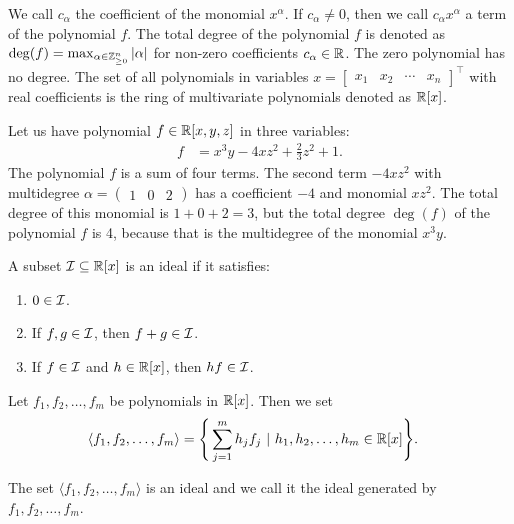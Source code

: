 We call $c_\alpha$ the coefficient of the monomial $x^\alpha$.
If $c_\alpha \neq 0$, then we call $c_\alpha x^\alpha$ a term of the polynomial $f$.
The total degree of the polynomial $f$ is denoted as $\deg(f) = \max_{\alpha\in\mathbb{Z}_{\geq0}^n} |\alpha|$ for non-zero coefficients $c_\alpha\in\mathbb{R}$.
The zero polynomial has no degree.
The set of all polynomials in variables $x = \begin{bmatrix}x_1 & x_2 & \cdots & x_n\end{bmatrix}^\top$ with real coefficients is the ring of multivariate polynomials denoted as $\mathbb{R}[x]$.

\begin{example}
  Let us have polynomial $f \in\mathbb{R}[x, y, z]$ in three variables:
  \begin{align}
    f &= x^3y - 4xz^2 + \frac{2}{3}z^2 + 1.
  \end{align}
  The polynomial $f$ is a sum of four terms.
  The second term $-4xz^2$ with multidegree $\alpha = \begin{pmatrix}1 & 0 & 2\end{pmatrix}$ has a coefficient $-4$ and monomial $xz^2$.
  The total degree of this monomial is $1 + 0 + 2 = 3$, but the total degree $\deg(f)$ of the polynomial $f$ is 4, because that is the multidegree of the monomial $x^3y$.
\end{example}

\begin{definition}
  A subset $\mathcal{I} \subseteq \mathbb{R}[x]$ is an ideal if it satisfies:
  \begin{enumerate}
    \item $0 \in \mathcal{I}$.
    \item If $f, g \in \mathcal{I}$, then $f + g \in \mathcal{I}$.
    \item If $f \in \mathcal{I}$ and $h \in \mathbb{R}[x]$, then $hf \in \mathcal{I}$.
  \end{enumerate}
\end{definition}

\begin{definition}
  Let $f_1, f_2, \ldots, f_m$ be polynomials in $\mathbb{R}[x]$.
  Then we set
  \begin{align}
     \langle f_1, f_2, \ldots, f_m\rangle &= \Bigg\{\sum_{j=1}^mh_jf_j\ |\ h_1, h_2, \ldots, h_m\in\mathbb{R}[x]\Bigg\}.
  \end{align}
\end{definition}

The set $\langle f_1, f_2, \ldots, f_m\rangle$ is an ideal and we call it the ideal generated by $f_1, f_2, \ldots, f_m$.
